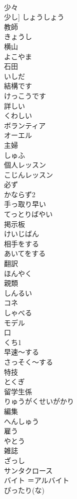 \documentclass[8pt]{extreport}
\begin{document}
\begin{CJK}{UTF8}{min}
\\	少々	
\\	少し]	しょうしょう
\\	教師	
\\	きょうし
\\	横山	
\\	よこやま
\\	石田	
\\	いしだ
\\	結構です	
\\	けっこうです
\\	詳しい	
\\	くわしい
\\	ボランティア	
\\	オーエル
\\	主婦	
\\	しゅふ
\\	個人レッスン	
\\	こじんレッスン
\\	必ず	
\\	かならず2
\\	手っ取り早い	
\\	てっとりばやい
\\	掲示板	
\\	けいじばん
\\	相手をする	
\\	あいてをする
\\	翻訳	
\\	ほんやく
\\	親類	
\\	しんるい
\\	コネ	
\\	しゃべる	
\\	モデル	
\\	口	
\\	くち1
\\	早速～する	
\\	さっそく～する
\\	特技	
\\	とくぎ
\\	留学生係	
\\	りゅうがくせいがかり
\\	編集	
\\	へんしゅう
\\	雇う	
\\	やとう
\\	雑誌	
\\	ざっし
\\	サンタクロース	
\\	バイト	＝アルバイト	
\\	ぴったり(な)	

\end{CJK}
\end{document}
